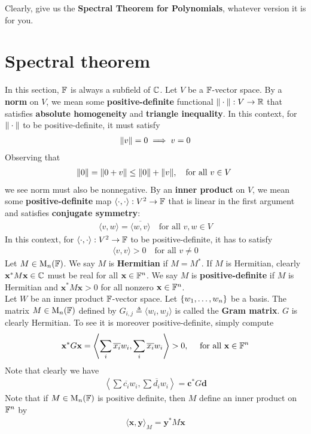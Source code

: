 \documentclass{report}
\begin{document}
Clearly,  give us the \textbf{Spectral Theorem for Polynomials}, whatever version it is for you. 
\section{Spectral theorem}
\label{Spectral Theorem}
In this section, $\mathbb{F}$ is always a subfield of  $\mathbb{C}$. Let  $V$ be a $\mathbb{F}$-vector space. By a \textbf{norm} on $V$, we mean some \textbf{positive-definite} functional $\| \cdot \|:V\to \mathbb{R}$ that satisfies \textbf{absolute homogeneity} and \textbf{triangle inequality}. In this context, for $\| \cdot \|$ to be positive-definite, it must satisfy 
\begin{align*}
  \| v \|=0 \implies  v=0
\end{align*}
Observing that  
\begin{align*}
\| 0 \|=\| 0+v \|\leq \| 0 \|+\| v \|,\quad \text{for all $v\in V$ }
\end{align*}
we see norm must also be nonnegative. By an \textbf{inner product} on $V$, we mean some \textbf{positive-definite}  map $\langle \cdot,\cdot\rangle : V^2 \rightarrow \mathbb{F}$ that is linear in the first argument and satisfies \textbf{conjugate symmetry}: 
\begin{align*}
\langle v,w\rangle = \overline{\langle w,v\rangle }\quad\text{for all }v,w \in V
\end{align*}
In this context, for $\langle \cdot,\cdot\rangle :V^2\rightarrow \mathbb{F}$ to be positive-definite, it has to satisfy 
\begin{align*}
\langle v,v\rangle >0\quad\text{for all }v\neq 0
\end{align*}
Let $M\in \operatorname{M}_n(\mathbb{F})$. We say $M$ is \textbf{Hermitian} if $M=M^*$. If $M$ is Hermitian, clearly  $\textbf{x}^* M \textbf{x}\in\mathbb{C}$ must be real for all $\textbf{x}\in \mathbb{F}^n$.  We say $M$ is  \textbf{positive-definite} if $M$ is Hermitian and $\textbf{x}^*M\textbf{x}>0$ for all nonzero $\textbf{x}\in \mathbb{F}^n$.  \\

\label{PAPD}
Let $W$ be an inner product  $\mathbb{F}$-vector space. Let $\left\{ w_1,\dots ,w_n \right\}$ be a basis. The matrix $M \in \operatorname{M}_n(\mathbb{F})$ defined by $G_{i,j}\triangleq \langle w_i,w_j\rangle $ is called the \textbf{Gram matrix}. $G$ is clearly Hermitian. To see it is moreover positive-definite, simply compute 
\begin{align*}
\textbf{x}^* G \textbf{x}= \left\langle \sum_i \overline{x_i}  w_i , \sum_i \overline{x_i} w_i\right \rangle >0,\quad \text{ for all }\textbf{x}\in \mathbb{F}^n
\end{align*}
Note that clearly we have 
 \begin{align*}
   \left\langle \sum \overline{c_i} w_i , \sum \overline{d_i} w_i \right\rangle = \textbf{c}^*G \textbf{d}
\end{align*}
Note that if $M \in \operatorname{M}_n(\mathbb{F})$ is positive definite, then $M$ define an inner product on  $\mathbb{F}^n$ by 
 \begin{align*}
\langle \textbf{x},\textbf{y}\rangle _M = \textbf{y}^* M \textbf{x}
\end{align*}
\end{document}
